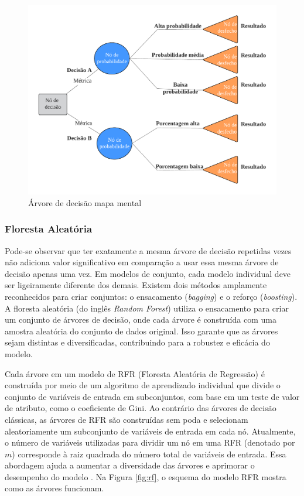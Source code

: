 \begin{figure}[H]
	\centering
	\caption{Árvore de decisão mapa mental}
	\label{fig:arvore-de-decisao}
	\includegraphics[width=\linewidth]{"Apendices/Figuras/modelagem-24h/Árvore de decisão"}
	
\end{figure}



\subsubsection{Floresta Aleat\'oria } \label{subsubsec:rf}

Pode-se observar que ter exatamente a mesma árvore de decisão repetidas vezes não adiciona valor significativo em comparação a usar essa mesma árvore de decisão apenas uma vez. Em modelos de conjunto, cada modelo individual deve ser ligeiramente diferente dos demais. Existem dois métodos amplamente reconhecidos para criar conjuntos: o ensacamento (\textit{bagging}) e o reforço (\textit{boosting}). A floresta aleatória (do inglês \textit{Random Forest}) utiliza o ensacamento para criar um conjunto de árvores de decisão, onde cada árvore é construída com uma amostra aleatória do conjunto de dados original. Isso garante que as árvores sejam distintas e diversificadas, contribuindo para a robustez e eficácia do modelo.



Cada árvore em um modelo de RFR (Floresta Aleatória de Regressão)  é construída por meio de um algoritmo de aprendizado individual que divide o conjunto de variáveis de entrada em subconjuntos, com base em um teste de valor de atributo, como o coeficiente de Gini. Ao contrário das árvores de decisão clássicas, as árvores de RFR são construídas sem poda e selecionam aleatoriamente um subconjunto de variáveis de entrada em cada nó. Atualmente, o número de variáveis utilizadas para dividir um nó em uma RFR (denotado por $m$) corresponde à raiz quadrada do número total de variáveis de entrada. Essa abordagem ajuda a aumentar a diversidade das árvores e aprimorar o desempenho do modelo \cite{Pelletier2016156}. Na Figura \ref{fig:rf}, o esquema do modelo RFR mostra como as árvores funcionam.

